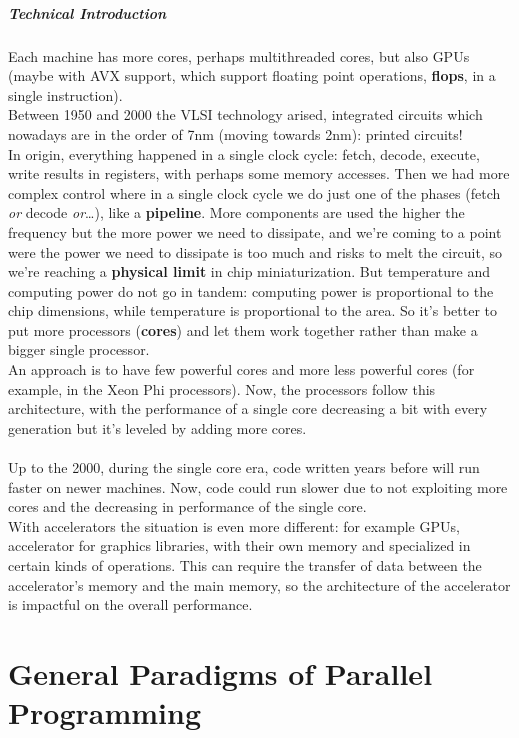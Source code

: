 \documentclass[10pt]{report}
\begin{document}
\paragraph{Technical Introduction} Each machine has more cores, perhaps multithreaded cores, but also GPUs (maybe with AVX support, which support floating point operations, \textbf{flops}, in a single instruction).\\
Between 1950 and 2000 the VLSI technology arised, integrated circuits which nowadays are in the order of 7nm (moving towards 2nm): printed circuits!\\
In origin, everything happened in a single clock cycle: fetch, decode, execute, write results in registers, with perhaps some memory accesses. Then we had more complex control where in a single clock cycle we do just one of the phases (fetch \textit{or} decode \textit{or}\ldots), like a \textbf{pipeline}. More components are used the higher the frequency but the more power we need to dissipate, and we're coming to a point were the power we need to dissipate is too much and risks to melt the circuit, so we're reaching a \textbf{physical limit} in chip miniaturization. But temperature and computing power do not go in tandem: computing power is proportional to the chip dimensions, while temperature is proportional to the area. So it's better to put more processors (\textbf{cores}) and let them work together rather than make a bigger single processor.\\
An approach is to have few powerful cores and more less powerful cores (for example, in the Xeon Phi processors). Now, the processors follow this architecture, with the performance of a single core decreasing a bit with every generation but it's leveled by adding more cores.\\\\
Up to the 2000, during the single core era, code written years before will run faster on newer machines. Now, code could run slower due to not exploiting more cores and the decreasing in performance of the single core.\\With accelerators the situation is even more different: for example GPUs, accelerator for graphics libraries, with their own memory and specialized in certain kinds of operations. This can require the transfer of data between the accelerator's memory and the main memory, so the architecture of the accelerator is impactful on the overall performance.
\chapter{General Paradigms of Parallel Programming}
\end{document}
